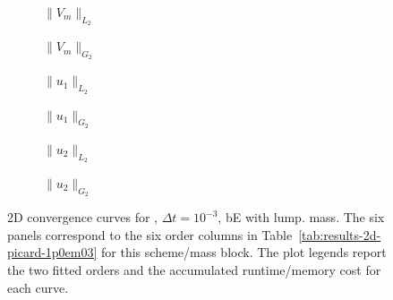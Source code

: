\begin{figure}[p]
\centering
\begin{subfigure}{0.485\linewidth}
\centering
{}
\caption{$\|V_m\|_{L_2}$}
\label{fig:results-2d-picard-1p0em03-backwardeuler-lumped-a}
\end{subfigure}
\hfill
\begin{subfigure}{0.485\linewidth}
\centering
{}
\caption{$\|V_m\|_{G_2}$}
\label{fig:results-2d-picard-1p0em03-backwardeuler-lumped-b}
\end{subfigure}
\par\vspace{0.8em}
\begin{subfigure}{0.485\linewidth}
\centering
{}
\caption{$\|u_1\|_{L_2}$}
\label{fig:results-2d-picard-1p0em03-backwardeuler-lumped-c}
\end{subfigure}
\hfill
\begin{subfigure}{0.485\linewidth}
\centering
{}
\caption{$\|u_1\|_{G_2}$}
\label{fig:results-2d-picard-1p0em03-backwardeuler-lumped-d}
\end{subfigure}
\par\vspace{0.8em}
\begin{subfigure}{0.485\linewidth}
\centering
{}
\caption{$\|u_2\|_{L_2}$}
\label{fig:results-2d-picard-1p0em03-backwardeuler-lumped-e}
\end{subfigure}
\hfill
\begin{subfigure}{0.485\linewidth}
\centering
{}
\caption{$\|u_2\|_{G_2}$}
\label{fig:results-2d-picard-1p0em03-backwardeuler-lumped-f}
\end{subfigure}
\caption{2D convergence curves for , $\Delta t=10^{-3}$, bE with lump. mass. The six panels correspond to the six order columns in Table~\ref{tab:results-2d-picard-1p0em03} for this scheme/mass block. The plot legends report the two fitted orders and the accumulated runtime/memory cost for each curve.}
\label{fig:results-2d-picard-1p0em03-backwardeuler-lumped}
\end{figure}
\FloatBarrier

